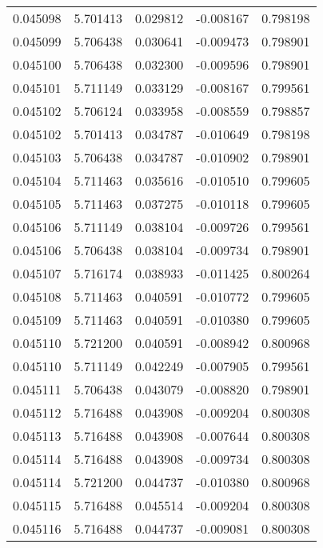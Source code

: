 \begin{tabular}{lrrrr}
0.045098    &  5.701413 &  0.029812 & -0.008167 &             0.798198 \\
0.045099    &  5.706438 &  0.030641 & -0.009473 &             0.798901 \\
0.045100    &  5.706438 &  0.032300 & -0.009596 &             0.798901 \\
0.045101    &  5.711149 &  0.033129 & -0.008167 &             0.799561 \\
0.045102    &  5.706124 &  0.033958 & -0.008559 &             0.798857 \\
0.045102    &  5.701413 &  0.034787 & -0.010649 &             0.798198 \\
0.045103    &  5.706438 &  0.034787 & -0.010902 &             0.798901 \\
0.045104    &  5.711463 &  0.035616 & -0.010510 &             0.799605 \\
0.045105    &  5.711463 &  0.037275 & -0.010118 &             0.799605 \\
0.045106    &  5.711149 &  0.038104 & -0.009726 &             0.799561 \\
0.045106    &  5.706438 &  0.038104 & -0.009734 &             0.798901 \\
0.045107    &  5.716174 &  0.038933 & -0.011425 &             0.800264 \\
0.045108    &  5.711463 &  0.040591 & -0.010772 &             0.799605 \\
0.045109    &  5.711463 &  0.040591 & -0.010380 &             0.799605 \\
0.045110    &  5.721200 &  0.040591 & -0.008942 &             0.800968 \\
0.045110    &  5.711149 &  0.042249 & -0.007905 &             0.799561 \\
0.045111    &  5.706438 &  0.043079 & -0.008820 &             0.798901 \\
0.045112    &  5.716488 &  0.043908 & -0.009204 &             0.800308 \\
0.045113    &  5.716488 &  0.043908 & -0.007644 &             0.800308 \\
0.045114    &  5.716488 &  0.043908 & -0.009734 &             0.800308 \\
0.045114    &  5.721200 &  0.044737 & -0.010380 &             0.800968 \\
0.045115    &  5.716488 &  0.045514 & -0.009204 &             0.800308 \\
0.045116    &  5.716488 &  0.044737 & -0.009081 &             0.800308 \\

\end{tabular}
